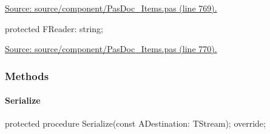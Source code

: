 \documentclass{report}
\newif\ifpdf
\begin{document}
\begin{list}{}
\begin{flushleft}
\ifpdf
\end{flushleft}
\fi


\par  \par
\href{https://github.com/pasdoc/pasdoc/blob/master/source/component/PasDoc_Items.pas#L769}{Source: source/component/PasDoc{\_}Items.pas (line 769).}\label{PasDoc_Items.TPasProperty-FReader}
\item[\textbf{FReader}\hfill]
\ifpdf
\begin{flushleft}
\fi
\begin{ttfamily}
protected FReader: string;\end{ttfamily}

\ifpdf
\end{flushleft}
\fi


\par  \par
\href{https://github.com/pasdoc/pasdoc/blob/master/source/component/PasDoc_Items.pas#L770}{Source: source/component/PasDoc{\_}Items.pas (line 770).}\end{list}
\subsubsection*{\large{\textbf{Methods}}\normalsize\hspace{1ex}\hfill}
\paragraph*{Serialize}\hspace*{\fill}

\label{PasDoc_Items.TPasProperty-Serialize}
\begin{list}{}{
\setlength{\itemindent}{0cm}
\setlength{\listparindent}{0cm}
\setlength{\leftmargin}{\evensidemargin}
\addtolength{\leftmargin}{\tmplength}
\settowidth{\labelsep}{X}
\addtolength{\leftmargin}{\labelsep}
\setlength{\labelwidth}{\tmplength}
}
\item[\textbf{Declaration}\hfill]
\ifpdf
\begin{flushleft}
\fi
\begin{ttfamily}
protected procedure Serialize(const ADestination: TStream); override;\end{ttfamily}

\ifpdf
\end{flushleft}
\fi

\end{list}
\end{document}
